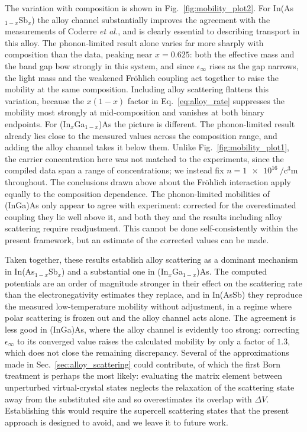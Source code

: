 \documentclass[aps,prmaterials,reprint,amsmath,amssymb,superscriptaddress]{revtex4-2}
\begin{document}
The variation with composition is shown in Fig.~\ref{fig:mobility_plot2}. For In(As$_{1-x}$Sb$_{x}$) the alloy channel substantially improves the agreement with the measurements of Coderre \textit{et al.}\cite{mob_Coderre1968}, and is clearly essential to describing transport in this alloy. The phonon-limited result alone varies far more sharply with composition than the data, peaking near $x=0.625$: both the effective mass and the band gap bow strongly in this system, and since $\epsilon_\infty$ rises as the gap narrows, the light mass and the weakened Fr{\"o}hlich coupling act together to raise the mobility at the same composition. Including alloy scattering flattens this variation, because the $x(1-x)$ factor in Eq.~\eqref{eq:alloy_rate} suppresses the mobility most strongly at mid-composition and vanishes at both binary endpoints.
For (In$_{x}$Ga$_{1-x}$)As the picture is different. The phonon-limited result already lies close to the measured values across the composition range, and adding the alloy channel takes it below them. Unlike Fig.~\ref{fig:mobility_plot1}, the carrier concentration here was not matched to the experiments, since the compiled data span a range of concentrations; we instead fix $n=\SI{1e16}{\per\cubic\centi\metre}$ throughout.
The conclusions drawn above about the Fr{\"o}hlich interaction apply equally to the composition dependence. The phonon-limited mobilities of (InGa)As only appear to agree with experiment: corrected for the overestimated coupling they lie well above it, and both they and the results including alloy scattering require readjustment. This cannot be done self-consistently within the present framework, but an estimate of the corrected values can be made.

Taken together, these results establish alloy scattering as a dominant mechanism in In(As$_{1-x}$Sb$_{x}$) and a substantial one in (In$_{x}$Ga$_{1-x}$)As. The computed potentials are an order of magnitude stronger in their effect on the scattering rate than the electronegativity estimates they replace, and in In(AsSb) they reproduce the measured low-temperature mobility without adjustment, in a regime where polar scattering is frozen out and the alloy channel acts alone. The agreement is less good in (InGa)As, where the alloy channel is evidently too strong: correcting $\epsilon_\infty$ to its converged value raises the calculated mobility by only a factor of $1.3$, which does not close the remaining discrepancy. Several of the approximations made in Sec.~\ref{sec:alloy_scattering} could contribute, of which the first Born treatment is perhaps the most likely: evaluating the matrix element between unperturbed virtual-crystal states neglects the relaxation of the scattering state away from the substituted site and so overestimates its overlap with $\Delta V$. Establishing this would require the supercell scattering states that the present approach is designed to avoid, and we leave it to future work.
\end{document}
